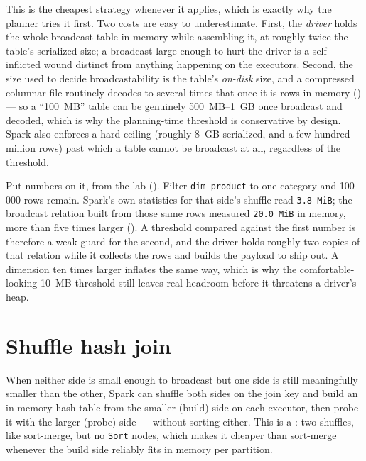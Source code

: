 This is the cheapest strategy whenever it applies, which is exactly why the
planner tries it first. Two costs are easy to underestimate. First, the
\emph{driver} holds the whole broadcast table in memory while assembling it,
at roughly twice the table's serialized size; a broadcast large enough to hurt
the driver is a self-inflicted wound distinct from anything happening on the
executors. Second, the size used to decide broadcastability is the table's
\emph{on-disk} size, and a compressed columnar file routinely decodes to
several times that once it is rows in memory () --- so a
``100~MB'' table can be genuinely 500~MB--1~GB once broadcast and decoded,
which is why the planning-time threshold is conservative by design. Spark also
enforces a hard ceiling (roughly 8~GB serialized, and a few hundred million
rows) past which a table cannot be broadcast at all, regardless of the
threshold.

Put numbers on it, from the lab (). Filter
\texttt{dim\_product} to one category and 100\,000 rows remain. Spark's own
statistics for that side's shuffle read \texttt{3.8 MiB}; the broadcast relation
built from those same rows measured \texttt{20.0 MiB} in memory, more than five
times larger (). A threshold compared against the
first number is therefore a weak guard for the second, and the driver holds
roughly two copies of that relation while it collects the rows and builds the
payload to ship out. A dimension ten times larger inflates the same way, which
is why the comfortable-looking 10~MB threshold still leaves real headroom
before it threatens a driver's heap.

\section{Shuffle hash join}
\label{sec:joins-shj}

When neither side is small enough to broadcast but one side is still
meaningfully smaller than the other, Spark can shuffle both sides on the join
key and build an in-memory hash table from the smaller (build) side on each
executor, then probe it with the larger (probe) side --- without sorting
either. This is a : two shuffles, like sort-merge, but
no \texttt{Sort} nodes, which makes it cheaper than sort-merge whenever the
build side reliably fits in memory per partition.


